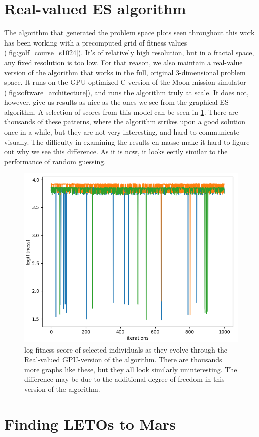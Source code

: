\section{Real-valued ES algorithm}
The algorithm that generated the problem space plots seen throughout this work has been working with a precomputed grid of fitness values (\cref{fig:golf_course_s1024}). It's of relatively high resolution, but in a fractal space, any fixed resolution is too low. For that reason, we also maintain a real-value version of the algorithm that works in the full, original 3-dimensional problem space. It runs on the GPU optimized C-version of the Moon-mission simulator (\cref{fig:software_architecture}), and runs the algorithm truly at scale. It does not, however, give us results as nice as the ones we see from the graphical ES algorithm. A selection of scores from this model can be seen in \cref{fig:GPUresults}. There are thousands of these patterns, where the algorithm strikes upon a good solution once in a while, but they are not very interesting, and hard to communicate visually. The difficulty in examining the results en masse make it hard to figure out why we see this difference. As it is now, it looks eerily similar to the performance of random guessing.

\begin{figure}[ht]
    \centering
    \includegraphics[width=0.6\linewidth]{fig/GPUresults.png}
    \caption{log-fitness score of selected individuals as they evolve through the Real-valued GPU-version of the algorithm. There are thousands more graphs like these, but they all look similarly uninteresting. The difference may be due to the additional degree of freedom in this version of the algorithm.}
    \label{fig:GPUresults}
\end{figure} 

\section{Finding LETOs to Mars}

